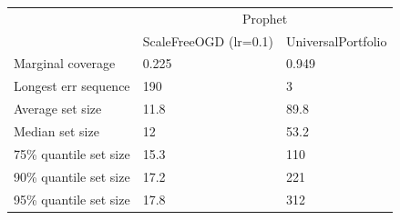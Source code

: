 \begin{tabular}{lll}
\toprule
& \multicolumn{2}{c}{Prophet} \\
& ScaleFreeOGD (lr=0.1) & UniversalPortfolio \\
\midrule
Marginal coverage & 0.225 & 0.949 \\
Longest err sequence & 190 & 3 \\
Average set size & 11.8 & 89.8 \\
Median set size & 12 & 53.2 \\
75\% quantile set size & 15.3 & 110 \\
90\% quantile set size & 17.2 & 221 \\
95\% quantile set size & 17.8 & 312 \\
\bottomrule
\end{tabular}
